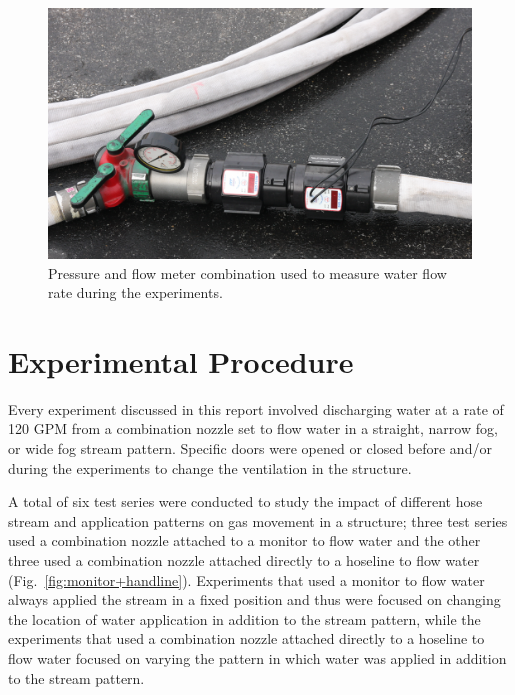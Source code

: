 \documentclass[12pt,oneside]{book}
\begin{document}
\begin{figure}[!ht]
	\includegraphics[width=6in]{../Figures/Pictures/flow_meter}
	\caption[Flow meter used to measure flow rate during experiments.]{Pressure and flow meter combination used to measure water flow rate during the experiments.}
	\label{fig:flow_meter}
\end{figure}
\FloatBarrier

\section{Experimental Procedure}
\label{sec:exp_procedure}
Every experiment discussed in this report involved discharging water at a rate of 120 GPM from a combination nozzle set to flow water in a straight, narrow fog, or wide fog stream pattern. Specific doors were opened or closed before and/or during the experiments to change the ventilation in the structure. 

A total of six test series were conducted to study the impact of different hose stream and application patterns on gas movement in a structure; three test series used a combination nozzle attached to a monitor to flow water and the other three used a combination nozzle attached directly to a hoseline to flow water (Fig.~\ref{fig:monitor+handline}). Experiments that used a monitor to flow water always applied the stream in a fixed position and thus were focused on changing the location of water application in addition to the stream pattern, while the experiments that used a combination nozzle attached directly to a hoseline to flow water focused on varying the pattern in which water was applied in addition to the stream pattern.
\end{document}
